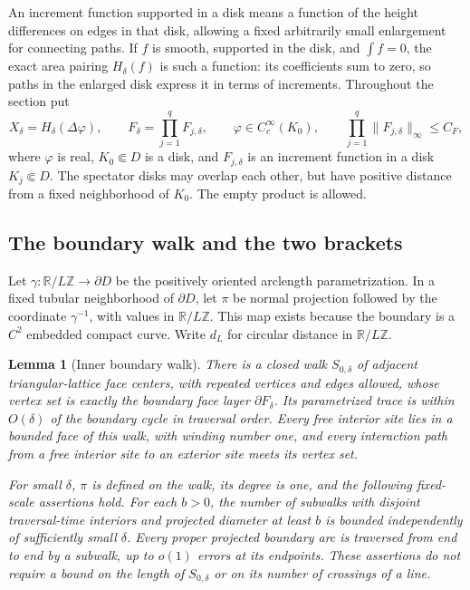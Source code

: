 \documentclass[11pt]{article}
\newcommand{\R}{\mathbb R}
\newcommand{\Z}{\mathbb Z}
\newtheorem{lemma}[theorem]{Lemma}
\theoremstyle{definition}
\theoremstyle{remark}
\numberwithin{equation}{section}
\begin{document}
An increment function supported in a disk means a function of the height
differences on edges in that disk, allowing a fixed arbitrarily small
enlargement for connecting paths.  If $f$ is smooth, supported in the disk,
and $\int f=0$, the exact area pairing $H_\delta(f)$ is such a function:
its coefficients sum to zero, so paths in the enlarged disk express it
in terms of increments.  Throughout the section put
\begin{equation}\label{pins:insertion-data}
 X_\delta=H_\delta(\Delta\varphi),\qquad
 F_\delta=\prod_{j=1}^q F_{j,\delta},\qquad
 \varphi\in C_c^\infty(K_0),\qquad
 \prod_{j=1}^q\|F_{j,\delta}\|_\infty\le C_F,
\end{equation}
where $\varphi$ is real, $K_0\Subset D$ is a disk, and $F_{j,\delta}$ is
an increment function in a disk $K_j\Subset D$.  The spectator disks may
overlap each other, but have positive distance from a fixed neighborhood
of $K_0$.  The empty product is allowed.

\subsection{The boundary walk and the two brackets}

Let $\gamma:\R/L\Z\longrightarrow\partial D$ be the positively oriented
arclength parametrization.  In a fixed tubular neighborhood of
$\partial D$, let $\pi$ be normal projection followed by the coordinate
$\gamma^{-1}$, with values in $\R/L\Z$.  This map exists because the
boundary is a $C^2$ embedded compact curve.  Write $d_L$ for circular
distance in $\R/L\Z$.

\begin{lemma}[Inner boundary walk]\label{lem:boundary-walk}
There is a closed walk $S_{0,\delta}$ of adjacent triangular-lattice face
centers, with repeated vertices and edges allowed, whose vertex set is
exactly the boundary face layer $\partial F_\delta$.  Its parametrized
trace is within $O(\delta)$ of the boundary cycle in traversal order.
Every free interior site lies in a bounded face of this walk, with
winding number one, and every interaction path from a free interior site
to an exterior site meets its vertex set.

For small $\delta$, $\pi$ is defined on the walk, its degree is one,
and the following fixed-scale assertions hold.  For each $b>0$, the
number of subwalks with disjoint traversal-time interiors and projected
diameter at least $b$ is bounded independently of sufficiently small
$\delta$.  Every proper projected boundary arc is traversed from end
to end by a subwalk, up to $o(1)$ errors at its endpoints.  These
assertions do not require a bound on the length of $S_{0,\delta}$ or
on its number of crossings of a line.
\end{lemma}
\end{document}
